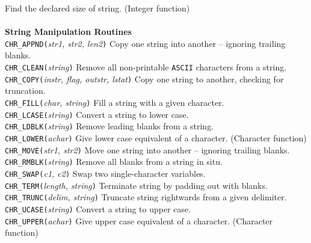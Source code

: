 \documentclass[twoside,11pt,nolof]{starlink}
\begin{document}
\begin{tabbing}
 Find the declared size of string. (Integer function)\\
\\
\textbf{String Manipulation Routines}\\
 {{\tt{CHR\_APPND(}}\emph{str1, str2, len2}\texttt{)}}\>
 Copy one string into another -- ignoring trailing blanks.\\
 {{\tt{CHR\_CLEAN(}}\emph{string}\texttt{)}}\>
 Remove all non-printable {\tt{ASCII}} characters from a string.\\
 {{\tt{CHR\_COPY(}}\emph{instr, flag, outstr, lstat}\texttt{)}}\>
 Copy one string to another, checking for truncation.\\
 {{\tt{CHR\_FILL(}}\emph{char, string}\texttt{)}}\>
 Fill a string with a given character.\\
 {{\tt{CHR\_LCASE(}}\emph{string}\texttt{)}}\>
 Convert a string to lower case.\\
 {{\tt{CHR\_LDBLK(}}\emph{string}\texttt{)}}\>
 Remove leading blanks from a string.\\
 {{\tt{CHR\_LOWER(}}\emph{achar}\texttt{)}}\>
 Give lower case equivalent of a character. (Character function)\\
 {{\tt{CHR\_MOVE(}}\emph{str1, str2}\texttt{)}}\>
 Move one string into another -- ignoring trailing blanks.\\
 {{\tt{CHR\_RMBLK(}}\emph{string}\texttt{)}}\>
 Remove all blanks from a string in situ.\\
 {{\tt{CHR\_SWAP(}}\emph{c1, c2}\texttt{)}}\>
 Swap two single-character variables.\\
 {{\tt{CHR\_TERM(}}\emph{length, string}\texttt{)}}\>
 Terminate string by padding out with blanks.\\
 {{\tt{CHR\_TRUNC(}}\emph{delim, string}\texttt{)}}\>
 Truncate string rightwards from a given delimiter.\\
 {{\tt{CHR\_UCASE(}}\emph{string}\texttt{)}}\>
 Convert a string to upper case.\\
 {{\tt{CHR\_UPPER(}}\emph{achar}\texttt{)}}\>
 Give upper case equivalent of a character. (Character function)
\end{tabbing}
\end{document}
